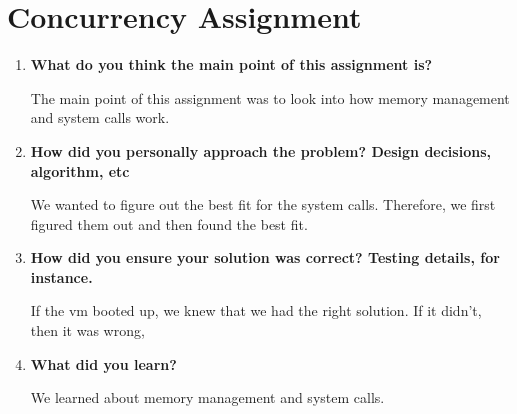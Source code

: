 \documentclass[letterpaper,10pt,titlepage,draftclsnofoot,onecolumn]{IEEEtran}
\begin{document}
\section{Concurrency Assignment}
\begin{enumerate}
\item \textbf{What do you think the main point of this assignment is?}

\par The main point of this assignment was to look into how memory management and system calls work.

\item \textbf{How did you personally approach the problem? Design decisions, algorithm, etc}

\par We wanted to figure out the best fit for the system calls. Therefore, we first figured them out and then found the best fit.

\item \textbf{How did you ensure your solution was correct? Testing details, for instance.}

\par If the vm booted up, we knew that we had the right solution. If it didn't, then it was wrong,

\item \textbf{What did you learn?}

\par We learned about memory management and system calls.

\end{enumerate}

\nocite{*}



\end{document}
